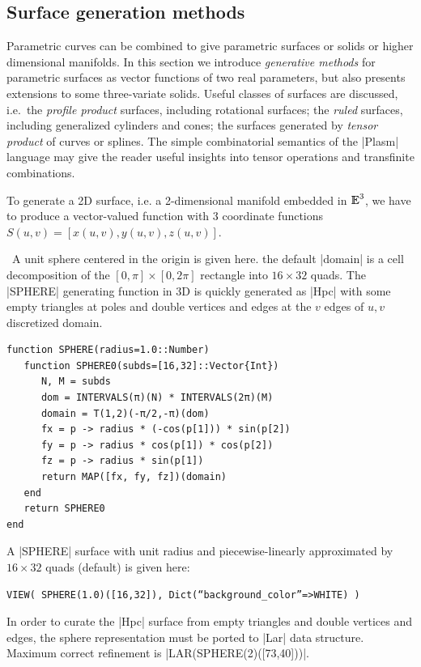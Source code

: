 \begin{coding}[Algebraic computation of FE = $\delta_1$]
\subsection{ Surface generation methods}\label{sect:5-4-2}

Parametric curves can be combined to give parametric surfaces or
solids or higher dimensional manifolds.  In this section we introduce \emph{generative methods} for parametric surfaces as
vector functions of two real parameters, but also presents extensions
to some three-variate solids.  Useful classes of surfaces are discussed, i.e.~the \emph{profile
product} surfaces, including rotational surfaces; the \emph{ruled}
surfaces, including generalized cylinders and cones; the surfaces
generated by \emph{tensor product} of curves or splines. 
The simple combinatorial semantics of the |Plasm| language
may give the reader useful insights into tensor operations and
transfinite combinations.


To generate a 2D surface, i.e. a 2-dimensional manifold embedded in $\mathbb{I\!\!E}^3$, we have to produce a vector-valued function with 3 coordinate functions $S(u,v) = [x(u,v), y(u,v), z(u,v)]$.


\begin{condition}\
A unit sphere centered in the origin is given here. the default |domain| is a cell  decomposition of the $[0,\pi] \times [0,2\pi]$ rectangle into $16\times 32$ quads.
The |SPHERE| generating function in 3D is quickly generated as |Hpc| with some empty triangles at poles and double vertices and edges at the $v$ edges of $u,v$ discretized domain. 
\begin{lstlisting}[language=JuliaLocal, style=julia, mathescape=true]
function SPHERE(radius=1.0::Number)
   function SPHERE0(subds=[16,32]::Vector{Int})
      N, M = subds
      dom = INTERVALS(π)(N) * INTERVALS(2π)(M)
      domain = T(1,2)(-π/2,-π)(dom)
      fx = p -> radius * (-cos(p[1])) * sin(p[2])
      fy = p -> radius * cos(p[1]) * cos(p[2])
      fz = p -> radius * sin(p[1])
      return MAP([fx, fy, fz])(domain)
   end
   return SPHERE0
end
\end{lstlisting}
A |SPHERE| surface with unit radius and piecewise-linearly approximated by  $16\times 32$ quads (default) is given here:
\begin{lstlisting}[language=JuliaLocal, style=julia, mathescape=true]
VIEW( SPHERE(1.0)([16,32]), Dict(“background_color”=>WHITE) )
\end{lstlisting}
In order to curate the |Hpc| surface from empty triangles and double vertices and edges,
the sphere representation must be ported to |Lar| data structure.
Maximum correct refinement is |LAR(SPHERE(2)([73,40]))|.
\end{condition}


\end{coding}
